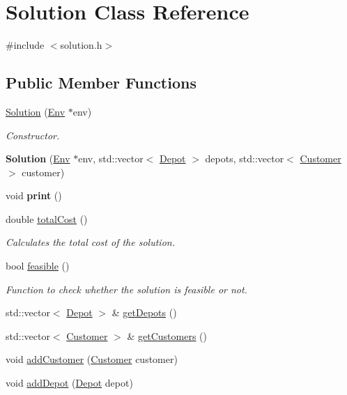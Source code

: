 \hypertarget{class_solution}{}\section{Solution Class Reference}
\label{class_solution}


{\ttfamily \#include $<$solution.\+h$>$}

\subsection*{Public Member Functions}
\begin{DoxyCompactItemize}
\item 
\hyperlink{class_solution_a3bdbdf455adecf7ab0f71bbce1efad66}{Solution} (\hyperlink{class_env}{Env} $\ast$env)
\begin{DoxyCompactList}\small\item\em Constructor. \end{DoxyCompactList}\item 
\mbox{\label{class_solution_ae5ae7771a56ee48728a905cd264730ac}} 
{\bfseries Solution} (\hyperlink{class_env}{Env} $\ast$env, std\+::vector$<$ \hyperlink{class_depot}{Depot} $>$ depots, std\+::vector$<$ \hyperlink{class_customer}{Customer} $>$ customer)
\item 
\mbox{\label{class_solution_a22519dee8cecd124e2e112a3a9bc505c}} 
void {\bfseries print} ()
\item 
double \hyperlink{class_solution_a227aaabdf34fbd2e01283728a5a344fe}{total\+Cost} ()
\begin{DoxyCompactList}\small\item\em Calculates the total cost of the solution. \end{DoxyCompactList}\item 
bool \hyperlink{class_solution_a13e4ebdccdbc8c572a82fb21254022d0}{feasible} ()
\begin{DoxyCompactList}\small\item\em Function to check whether the solution is feasible or not. \end{DoxyCompactList}\item 
std\+::vector$<$ \hyperlink{class_depot}{Depot} $>$ \& \hyperlink{class_solution_ab950712d080e8fcfda4d7f5b7126f1e6}{get\+Depots} ()
\item 
std\+::vector$<$ \hyperlink{class_customer}{Customer} $>$ \& \hyperlink{class_solution_a535607b6b1cfd652f783c18f742be458}{get\+Customers} ()
\item 
void \hyperlink{class_solution_a360f5711f6da7daba2d4eff39bfb00fc}{add\+Customer} (\hyperlink{class_customer}{Customer} customer)
\item 
void \hyperlink{class_solution_af9d6aadb375d6e9ddadc8fcf31a53cf6}{add\+Depot} (\hyperlink{class_depot}{Depot} depot)
\end{DoxyCompactItemize}

